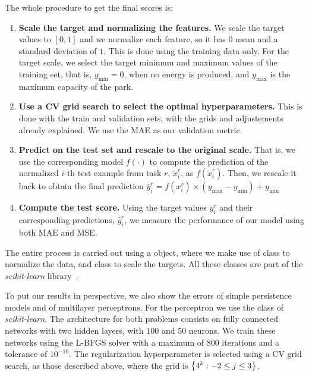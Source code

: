 %
The whole procedure to get the final scores is:
\begin{enumerate}
    \item \textbf{Scale the target and normalizing the features.} We scale the target values to $[0, 1]$ and we normalize each feature, so it has $0$ mean and a standard deviation of $1$. This is done using the training data only. 
    For the target scale, we select the target minimum and maximum values of the training set, that is, $y_\text{min} = 0$, when no energy is produced, and $y_\text{max}$ is the maximum capacity of the park.    
    \item \textbf{Use a CV grid search to select the optimal hyperparameters.} This is done with the train and validation sets, with the grids and adjustements already explained. We use the MAE as our validation metric.
    \item \textbf{Predict on the test set and rescale to the original scale.} That is, we use the corresponding model $f(\cdot)$ to compute the prediction of the normalized $i$-th test example from task $r$, $\tilde{x}_i^r$, as $f(\tilde{x}_i^r)$. Then, we rescale it back to obtain the final prediction $\hat{y}_i^r = f(x_i^r) \times (y_\text{max} - y_\text{min} ) + y_\text{min}$
    \item \textbf{Compute the test score.} Using the target values $y_i^r$ and their corresponding predictions, $\hat{y}_i^r$, we measure the performance of our model using both MAE and MSE.
\end{enumerate}
The entire process is carried out using a  object, where we make use of class  to normalize the data, and  class to scale the targets. All these classes are part of the \emph{scikit-learn} library~\citep{scikit-learn}.

%
To put our results in perspective, we also show the errors of simple persistence models and of multilayer perceptrons. For the perceptron we use the  class of \emph{scikit-learn}. The architecture for both problems consists on fully connected networks with two hidden layers, with $100$ and $50$ neurons. We train these networks using the L-BFGS solver with a maximum of $800$ iterations and a tolerance of $10^{-10}$. The regularization hyperparameter is selected using a CV grid search, as those described above, where the grid is $\left\{4^k: -2 \leq j \leq 3\right\}$.






